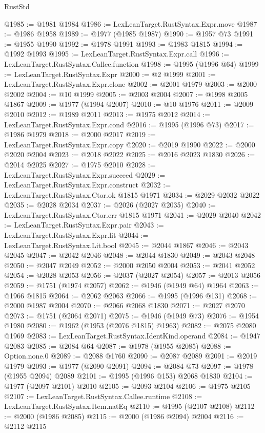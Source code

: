 \begin{lexlean}{RustStd}
\begin{coremodule}
@1985 := @1981 @1984
@1986 := LexLeanTarget.RustSyntax.Expr.move
@1987 := @1986 @1958
@1989 := @1977 (@1985 @1987)
@1990 := @1957 @73
@1991 := @1955 @1990
@1992 := @1978 @1991
@1993 := @1983 @1815
@1994 := @1992 @1993
@1995 := LexLeanTarget.RustSyntax.Expr.call
@1996 := LexLeanTarget.RustSyntax.Callee.function
@1998 := @1995 (@1996 @64)
@1999 := LexLeanTarget.RustSyntax.Expr
@2000 := @2 @1999
@2001 := LexLeanTarget.RustSyntax.Expr.clone
@2002 := @2001 @1979
@2003 := @2000 @2002
@2004 := @10 @1999
@2005 := @2003 @2004
@2007 := @1998 @2005 @1867
@2009 := @1977 (@1994 @2007)
@2010 := @10 @1976
@2011 := @2009 @2010
@2012 := @1989 @2011
@2013 := @1975 @2012
@2014 := LexLeanTarget.RustSyntax.Expr.cond
@2016 := @1995 (@1996 @73)
@2017 := @1986 @1979
@2018 := @2000 @2017
@2019 := LexLeanTarget.RustSyntax.Expr.copy
@2020 := @2019 @1990
@2022 := @2000 @2020 @2004
@2023 := @2018 @2022
@2025 := @2016 @2023 @1830
@2026 := @2014 @2025
@2027 := @1975 @2010
@2028 := LexLeanTarget.RustSyntax.Expr.succeed
@2029 := LexLeanTarget.RustSyntax.Expr.construct
@2032 := LexLeanTarget.RustSyntax.Ctor.ok @1815 @1971
@2034 := @2029 @2032 @2022
@2035 := @2028 @2034
@2037 := @2026 (@2027 @2035)
@2040 := LexLeanTarget.RustSyntax.Ctor.err @1815 @1971
@2041 := @2029 @2040
@2042 := LexLeanTarget.RustSyntax.Expr.pair
@2043 := LexLeanTarget.RustSyntax.Expr.lit
@2044 := LexLeanTarget.RustSyntax.Lit.bool
@2045 := @2044 @1867
@2046 := @2043 @2045
@2047 := @2042 @2046
@2048 := @2044 @1830
@2049 := @2043 @2048
@2050 := @2047 @2049
@2052 := @2000 @2050 @2004
@2053 := @2041 @2052
@2054 := @2028 @2053
@2056 := @2037 (@2027 @2054)
@2057 := @2013 @2056
@2059 := @1751 (@1974 @2057)
@2062 := @1946 (@1949 @64) @1964
@2063 := @1966 @1815
@2064 := @2062 @2063
@2066 := @1995 (@1996 @131)
@2068 := @2000 @1987 @2004
@2070 := @2066 @2068 @1830
@2071 := @2027 @2070
@2073 := @1751 (@2064 @2071)
@2075 := @1946 (@1949 @73)
@2076 := @1954 @1980
@2080 := @1962 (@1953 (@2076 @1815) @1963)
@2082 := @2075 @2080 @1969
@2083 := LexLeanTarget.RustSyntax.IdentKind.operand
@2084 := @1947 @2083
@2085 := @2084 @64
@2087 := @1978 (@1955 @2085)
@2088 := Option.none.{0}
@2089 := @2088 @1760
@2090 := @2087 @2089
@2091 := @2019 @1979
@2093 := @1977 (@2090 @2091)
@2094 := @2084 @73
@2097 := @1978 (@1955 @2094) @2089
@2101 := @1995 (@1996 @153) @2068 @1830
@2104 := @1977 (@2097 @2101) @2010
@2105 := @2093 @2104
@2106 := @1975 @2105
@2107 := LexLeanTarget.RustSyntax.Callee.runtime
@2108 := LexLeanTarget.RustSyntax.Item.natEq
@2110 := @1995 (@2107 @2108)
@2112 := @2000 (@1986 @2085)
@2115 := @2000 (@1986 @2094) @2004
@2116 := @2112 @2115

\end{coremodule}
\end{lexlean}
